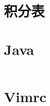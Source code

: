 \documentclass[titlepage,landscape,a4paper,10pt]{article}
\begin{document}
\section{积分表}



\begin{multicols}{2}
\begin{spacing}{0.8}


\section{Java}
\inputminted{java}{src/Main.java}

\section{Vimrc}
\inputminted{text}{src/vimrc.vim}
\end{spacing}

\end{multicols}
\end{document}
